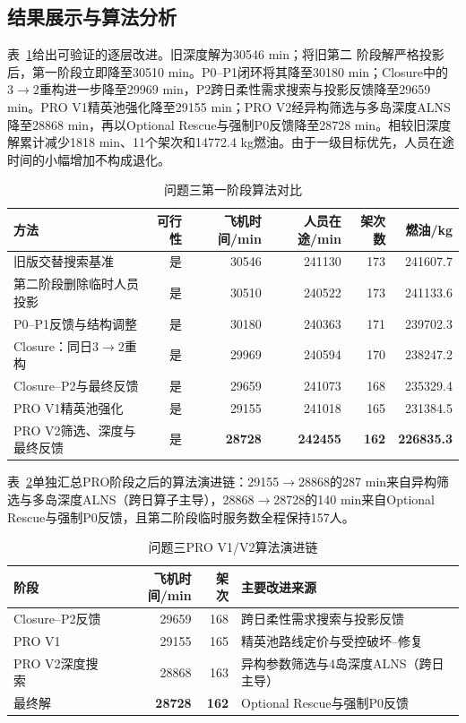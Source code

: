 \documentclass[UTF8,a4paper,zihao=5]{ctexart}
\begin{document}
\subsection{结果展示与算法分析}

表~\ref{tab:q3-stage1-comparison}给出可验证的逐层改进。旧深度解为30546 min；将旧第二
阶段解严格投影后，第一阶段立即降至30510 min。P0--P1闭环将其降至30180 min；Closure中的$3\to2$重构进一步降至29969 min，P2跨日柔性需求搜索与投影反馈降至29659 min。PRO V1精英池强化降至29155 min；PRO V2经异构筛选与多岛深度ALNS降至28868 min，再以Optional Rescue与强制P0反馈降至28728 min。相较旧深度解累计减少1818 min、11个架次和14772.4 kg燃油。由于一级目标优先，人员在途时间的小幅增加不构成退化。

\begin{table}[htbp]
  \centering
  \caption{问题三第一阶段算法对比}
  \label{tab:q3-stage1-comparison}
  \begin{tabularx}{\linewidth}{Xrrrrr}
    \toprule
    方法 & 可行性 & 飞机时间/min & 人员在途/min & 架次数 & 燃油/kg \\
    \midrule
    旧版交替搜索基准 & 是 & 30546 & 241130 & 173 & 241607.7 \\
    第二阶段删除临时人员投影 & 是 & 30510 & 240522 & 173 & 241133.6 \\
    P0--P1反馈与结构调整 & 是 & 30180 & 240363 & 171 & 239702.3 \\
    Closure：同日$3\to2$重构 & 是 & 29969 & 240594 & 170 & 238247.2 \\
    Closure--P2与最终反馈 & 是 & 29659 & 241073 & 168 & 235329.4 \\
    PRO V1精英池强化 & 是 & 29155 & 241018 & 165 & 231384.5 \\
    PRO V2筛选、深度与最终反馈 & 是 & \textbf{28728} & \textbf{242455} & \textbf{162} & \textbf{226835.3} \\
    \bottomrule
  \end{tabularx}
\end{table}

表~\ref{tab:q3-evolution}单独汇总PRO阶段之后的算法演进链：29155$\to$28868的287 min来自异构筛选与多岛深度ALNS（跨日算子主导），28868$\to$28728的140 min来自Optional Rescue与强制P0反馈，且第二阶段临时服务数全程保持157人。

\begin{table}[htbp]
  \centering
  \caption{问题三PRO V1/V2算法演进链}
  \label{tab:q3-evolution}
  \begin{tabularx}{\linewidth}{XrrX}
    \toprule
    阶段 & 飞机时间/min & 架次 & 主要改进来源 \\
    \midrule
    Closure--P2反馈 & 29659 & 168 & 跨日柔性需求搜索与投影反馈 \\
    PRO V1 & 29155 & 165 & 精英池路线定价与受控破坏--修复 \\
    PRO V2深度搜索 & 28868 & 163 & 异构参数筛选与4岛深度ALNS（跨日主导） \\
    最终解 & \textbf{28728} & \textbf{162} & Optional Rescue与强制P0反馈 \\
    \bottomrule
  \end{tabularx}
\end{table}
\end{document}
